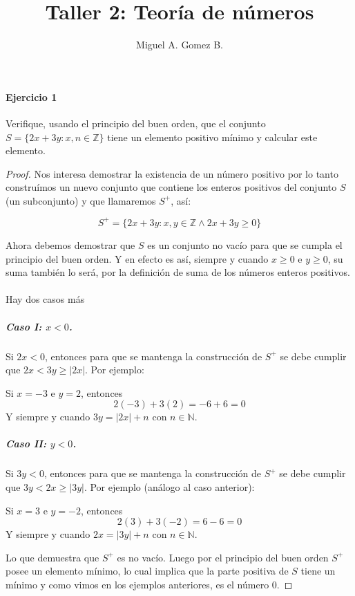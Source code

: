 \documentclass{article}
\title{Taller 2: Teoría de números}
\author{Miguel A. Gomez B.}
\begin{document}
	
	\maketitle
	
\paragraph{Ejercicio 1} Verifique, usando el principio del buen orden, que el conjunto $S = \{ 2x + 3y: x, n \in \mathbb{Z} \}$ tiene un elemento positivo mínimo y calcular este elemento.

\begin{proof}
Nos interesa demostrar la existencia de un número positivo por lo tanto construímos un nuevo conjunto que contiene los enteros positivos del conjunto $S$ (un subconjunto) y que llamaremos $S^+$, así:

\begin{equation}\label{eq:1}
S^+ = \{2x + 3y : x,y \in \mathbb{Z} \land 2x + 3y \ge 0\}
\end{equation}

Ahora debemos demostrar que $S$ es un conjunto no vacío para que se cumpla el principio del buen orden. Y en efecto es así, siempre y cuando $x\geq0$ e $y\geq0$, su suma también lo será, por la definición de suma de los números enteros positivos.

\paragraph{}
Hay dos casos más

\subparagraph{Caso I: $x<0$.} Si $2x < 0$, entonces para que se mantenga la construcción de $S^+$ se debe cumplir que $2x < 3y \geq |2x|$. Por ejemplo:
\begin{center}
	Si $x=-3$ e $y=2$, entonces
	\[
	2(-3) + 3(2) = -6 + 6 = 0
	\]
	Y siempre y cuando $3y = |2x| + n$ con $n \in \mathbb{N}$.
\end{center}

\subparagraph{Caso II: $y<0$.} Si $3y < 0$, entonces para que se mantenga la construcción de $S^+$ se debe cumplir que $3y < 2x \geq |3y|$. Por ejemplo (análogo al caso anterior):

\begin{center}
	Si $x=3$ e $y=-2$, entonces
	\[
	2(3) + 3(-2) = 6 - 6 = 0
	\]
	Y siempre y cuando $2x = |3y| + n$ con $n \in \mathbb{N}$.
\end{center}

Lo que demuestra que $S^+$ es no vacío. Luego por el principio del buen orden $S^+$ posee un elemento mínimo, lo cual implica que la parte positiva de $S$ tiene un mínimo y como vimos en los ejemplos anteriores, es el número $0$.
\end{proof}
\end{document}

